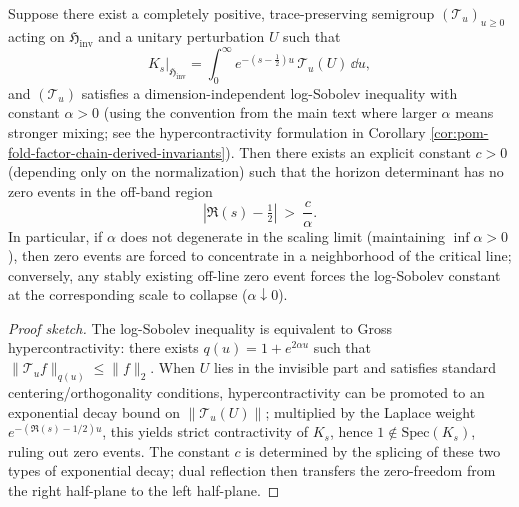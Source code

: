 \begin{proposition}\label{prop:op-algebra-logsobolev-zero-band}
Suppose there exist a completely positive, trace-preserving semigroup \((\mathcal{T}_u)_{u\ge 0}\) acting on \(\mathfrak{H}_{\mathrm{inv}}\) and a unitary perturbation \(U\) such that
\[
K_s\big|_{\mathfrak{H}_{\mathrm{inv}}}
=\int_{0}^{\infty}e^{-(s-\tfrac12)u}\,\mathcal{T}_u(U)\,\dd u,
\]
and \((\mathcal{T}_u)\) satisfies a dimension-independent log-Sobolev inequality with constant \(\alpha>0\) (using the convention from the main text where larger \(\alpha\) means stronger mixing; see the hypercontractivity formulation in Corollary \ref{cor:pom-fold-factor-chain-derived-invariants}).
Then there exists an explicit constant \(c>0\) (depending only on the normalization) such that the horizon determinant has no zero events in the off-band region
\[
|\Re(s)-\tfrac12|\ >\ \frac{c}{\alpha}.
\]
In particular, if \(\alpha\) does not degenerate in the scaling limit (maintaining \(\inf \alpha>0\)), then zero events are forced to concentrate in a neighborhood of the critical line;
conversely, any stably existing off-line zero event forces the log-Sobolev constant at the corresponding scale to collapse (\(\alpha\downarrow 0\)).
\end{proposition}
\begin{proof}[Proof sketch]
The log-Sobolev inequality is equivalent to Gross hypercontractivity: there exists \(q(u)=1+e^{2\alpha u}\) such that \(\|\mathcal{T}_u f\|_{q(u)}\le \|f\|_2\).
When \(U\) lies in the invisible part and satisfies standard centering/orthogonality conditions, hypercontractivity can be promoted to an exponential decay bound on \(\|\mathcal{T}_u(U)\|\);
multiplied by the Laplace weight \(e^{-(\Re(s)-1/2)u}\), this yields strict contractivity of \(K_s\), hence \(1\notin\mathrm{Spec}(K_s)\), ruling out zero events.
The constant \(c\) is determined by the splicing of these two types of exponential decay; dual reflection then transfers the zero-freedom from the right half-plane to the left half-plane. \qedhere
\end{proof}
\endinput


